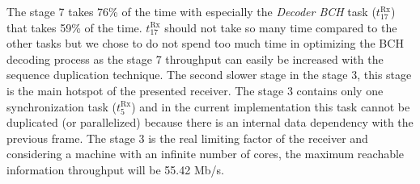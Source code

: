 The stage 7 takes 76\% of the time with especially the \emph{Decoder BCH} task
($t^\text{Rx}_{17}$) that takes 59\% of the time. $t^\text{Rx}_{17}$ should not
take so many time compared to the other tasks but we chose to do not spend too
much time in optimizing the BCH decoding process as the stage 7 throughput can
easily be increased with the sequence duplication technique.
The second slower stage in the stage 3, this stage is the main hotspot of the
presented receiver. The stage 3 contains only one synchronization task
($t^\text{Rx}_{5}$) and in the current implementation this task cannot be
duplicated (or parallelized) because there is an internal data dependency with
the previous frame. The stage 3 is the real limiting factor of the receiver
and considering a machine with an infinite number of cores, the maximum
reachable information throughput will be 55.42 Mb/s.

